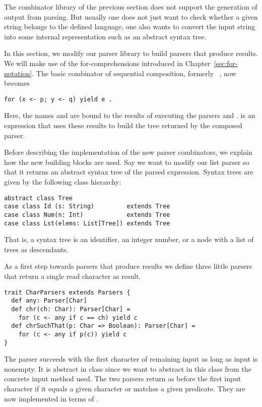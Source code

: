 {The combinator library of the previous section does not support the
generation of output from parsing. But usually one does not just want
to check whether a given string belongs to the defined language, one
also wants to convert the input string into some internal
representation such as an abstract syntax tree.

In this section, we modify our parser library to build parsers that
produce results. We will make use of the for-comprehensions introduced
in Chapter~\ref{sec:for-notation}.  The basic combinator of sequential
composition, formerly ~, now becomes
\begin{lstlisting}
for (x <- p; y <- q) yield e .
\end{lstlisting}
Here, the names  and  are bound to the results of
executing the parsers  and .  is an expression
that uses these results to build the tree returned by the composed
parser.

Before describing the implementation of the new parser combinators, we
explain how the new building blocks are used. Say we want to modify
our list parser so that it returns an abstract syntax tree of the
parsed expression. Syntax trees are given by the following class hierarchy:
\begin{lstlisting}
abstract class Tree
case class Id (s: String)         extends Tree
case class Num(n: Int)            extends Tree
case class Lst(elems: List[Tree]) extends Tree
\end{lstlisting}
That is, a syntax tree is an identifier, an integer number, or a
 node with a list of trees as descendants.

As a first step towards parsers that produce results we define three
little parsers that return a single read character as result.
\begin{lstlisting}
trait CharParsers extends Parsers {
  def any: Parser[Char]
  def chr(ch: Char): Parser[Char] =
    for (c <- any if c == ch) yield c
  def chrSuchThat(p: Char => Boolean): Parser[Char] =
    for (c <- any if p(c)) yield c
}
\end{lstlisting}
The  parser succeeds with the first character of remaining
input as long as input is nonempty. It is abstract in class
 since we want to abstract in this class from the
concrete input method used.  The two  parsers return as before
the first input character if it equals a given character or matches a
given predicate. They are now implemented in terms of .

}
